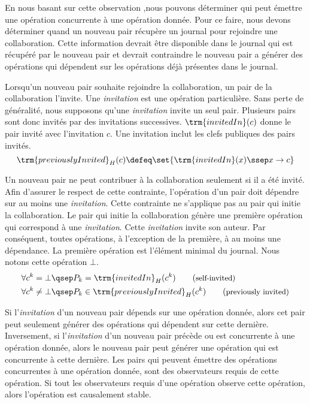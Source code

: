 En nous basant sur cette observation ,nous pouvons déterminer qui peut émettre une opération concurrente à une opération donnée.
Pour ce faire, nous devons déterminer quand un nouveau pair récupère un journal pour rejoindre une collaboration.
Cette information devrait être disponible dans le journal qui est récupéré par le nouveau pair et devrait contraindre le nouveau pair a générer des opérations qui dépendent sur les opérations déjà présentes dans le journal.

Lorsqu'un nouveau pair souhaite rejoindre la collaboration, un pair de la collaboration l'invite.
Une \emph{invitation} est une opération particulière.
Sans perte de généralité, nous supposons qu'une \emph{invitation} invite un seul pair.
Plusieurs pairs sont donc invités par des invitations successives.
$\trm{invitedIn}(c)$ donne le pair invité avec l'invitation $c$.
Une invitation inclut les clefs publiques des pairs invités.
\begin{equation*}
\trm{previouslyInvited}_H(c) \defeq \set{\trm{invitedIn}(x) \ssep x \to c}
\end{equation*}


Un nouveau pair ne peut contribuer à la collaboration seulement si il a été invité.
Afin d'assurer le respect de cette contrainte, l'opération d'un pair doit dépendre sur au moins une \emph{invitation}.
Cette contrainte ne s'applique pas au pair qui initie la collaboration.
Le pair qui initie la collaboration génère une première opération qui correspond à une \emph{invitation}.
Cette \emph{invitation} invite son auteur.
Par conséquent, toutes opérations, à l'exception de la première, à au moins une dépendance.
La première opération est l'élément minimal du journal.
Nous notons cette opération $\bot$.
\begin{align*}
&\forall c^k = \bot \qsep P_k = \trm{invitedIn}_H(c^k) \tag{\small self-invited}\\
&\forall c^k \neq \bot \qsep P_k \in \trm{previouslyInvited}_H(c^k) \tag{\small previously invited}
\end{align*}

Si l'\emph{invitation} d'un nouveau pair dépends sur une opération donnée, alors cet pair peut seulement générer des opérations qui dépendent sur cette dernière.
Inversement, si l'\emph{invitation} d'un nouveau pair précède ou est concurrente à une opération donnée, alors le nouveau pair peut générer une opération qui est concurrente à cette dernière.
Les pairs qui peuvent émettre des opérations concurrentes à une opération donnée, sont des observateurs requis de cette opération.
Si tout les observateurs requis d'une opération observe cette opération, alors l'opération est causalement stable.

